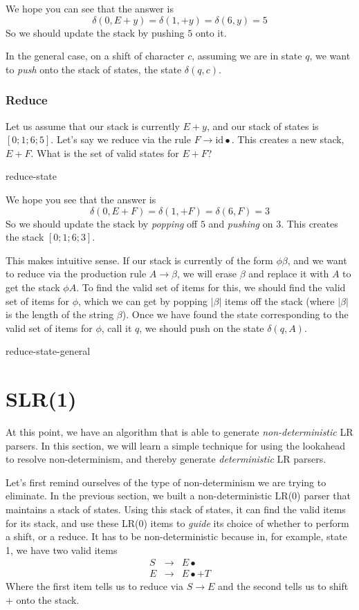 We hope you can see that the answer is 
\[\delta(0, E+y) = \delta(1, +y) = \delta(6, y) = 5\]
So we should update the stack by pushing $5$ onto it.

In the general case, on a shift of character $c$, assuming we are in state $q$, we want to \textit{push} onto the stack of states, the state $\delta(q, c)$.

\subsubsection{Reduce}
Let us assume that our stack is currently $E+y$, and our stack of states is $[0;1;6;5]$. Let's say we reduce via the rule $F \to \text{id} \bullet$. This creates a new stack, $E+F$. What is the set of valid states for $E+F$?
\begin{center}
    {reduce-state}
\end{center}
We hope you see that the answer is \[\delta(0, E+F) = \delta(1, +F) = \delta(6, F) = 3\] So we should update the stack by \textit{popping} off $5$ and \textit{pushing} on $3$. This creates the stack $[0;1;6;3]$.

This makes intuitive sense. If our stack is currently of the form $\phi\beta$, and we want to reduce via the production rule $A \to \beta$, we will erase $\beta$ and replace it with $A$ to get the stack $\phi A$. To find the valid set of items for this, we should find the valid set of items for $\phi$, which we can get by popping $|\beta|$ items off the stack (where $|\beta|$ is the length of the string $\beta$). Once we have found the state corresponding to the valid set of items for $\phi$, call it $q$, we should push on the state $\delta(q, A)$.

\begin{center}
    {reduce-state-general}
\end{center}




\section{SLR(1)}\label{section:slr1}
At this point, we have an algorithm that is able to generate \textit{non-deterministic} LR parsers. In this section, we will learn a simple technique for using the lookahead to resolve non-determinism, and thereby generate \textit{deterministic} LR parsers. 

Let's first remind ourselves of the type of non-determinism we are trying to eliminate. In the previous section, we built a non-deterministic LR($0$) parser that maintains a stack of states. Using this stack of states, it can find the valid items for its stack, and use these LR($0$) items to \textit{guide} its choice of whether to perform a shift, or a reduce. It has to be non-deterministic because in, for example, state 1, we have two valid items
\[
\begin{array}{rcl}
     S&\to&E\bullet  \\
     E&\to&E\bullet+T 
\end{array}
\]
Where the first item tells us to reduce via $S \to E$ and the second tells us to shift $+$ onto the stack.

